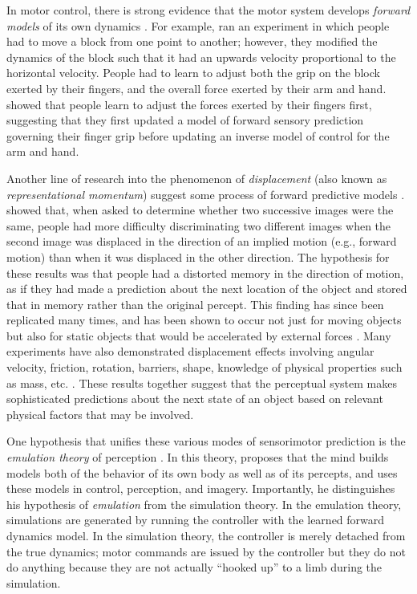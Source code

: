 \documentclass[12pt]{article}
\begin{document}
In motor control, there is strong evidence that the motor system develops \textit{forward models} of its own dynamics \citep{Kawato1999,Flanagan2003}. For example, \cite{Flanagan2003} ran an experiment in which people had to move a block from one point to another; however, they modified the dynamics of the block such that it had an upwards velocity proportional to the horizontal velocity. People had to learn to adjust both the grip on the block exerted by their fingers, and the overall force exerted by their arm and hand. \cite{Flanagan2003} showed that people learn to adjust the forces exerted by their fingers first, suggesting that they first updated a model of forward sensory prediction governing their finger grip before updating an inverse model of control for the arm and hand.

Another line of research into the phenomenon of \textit{displacement} (also known as \textit{representational momentum}) suggest some process of forward predictive models \citep{Freyd1984,Freyd1988,Hubbard2005}. \cite{Freyd1984} showed that, when asked to determine whether two successive images were the same, people had more difficulty discriminating two different images when the second image was displaced in the direction of an implied motion (e.g., forward motion) than when it was displaced in the other direction. The hypothesis for these results was that people had a distorted memory in the direction of motion, as if they had made a prediction about the next location of the object and stored that in memory rather than the original percept. This finding has since been replicated many times, and has been shown to occur not just for moving objects but also for static objects that would be accelerated by external forces \citep{Freyd1988}. Many experiments have also demonstrated displacement effects involving angular velocity, friction, rotation, barriers, shape, knowledge of physical properties such as mass, etc. \citep{Hubbard2005}. These results together suggest that the perceptual system makes sophisticated predictions about the next state of an object based on relevant physical factors that may be involved.

One hypothesis that unifies these various modes of sensorimotor prediction is the \textit{emulation theory} of perception \citep{Grush2004}. In this theory, \cite{Grush2004} proposes that the mind builds models both of the behavior of its own body as well as of its percepts, and uses these models in control, perception, and imagery. Importantly, he distinguishes his hypothesis of \textit{emulation} from the simulation theory. In the emulation theory, simulations are generated by running the controller with the learned forward dynamics model. In the simulation theory, the controller is merely detached from the true dynamics; motor commands are issued by the controller but they do not do anything because they are not actually ``hooked up'' to a limb during the simulation.
\end{document}
